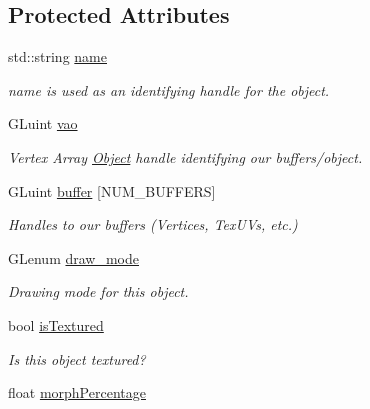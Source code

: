 \subsection*{Protected Attributes}
\begin{DoxyCompactItemize}
\item 
std\-::string \hyperlink{class_object_a24457e0a387492c80594aec7681a2277}{name}
\begin{DoxyCompactList}\small\item\em name is used as an identifying handle for the object. \end{DoxyCompactList}\item 
G\-Luint \hyperlink{class_object_a66190fee29d03d6478516686cbd01eb8}{vao}
\begin{DoxyCompactList}\small\item\em Vertex Array \hyperlink{class_object}{Object} handle identifying our buffers/object. \end{DoxyCompactList}\item 
\hypertarget{class_object_a29de966ce95d96e19262c4f10f0b4276}{G\-Luint \hyperlink{class_object_a29de966ce95d96e19262c4f10f0b4276}{buffer} \mbox{[}N\-U\-M\-\_\-\-B\-U\-F\-F\-E\-R\-S\mbox{]}}\label{class_object_a29de966ce95d96e19262c4f10f0b4276}

\begin{DoxyCompactList}\small\item\em Handles to our buffers (Vertices, Tex\-U\-Vs, etc.) \end{DoxyCompactList}\item 
G\-Lenum \hyperlink{class_object_a82764b385767d989f27d301ab206acb8}{draw\-\_\-mode}
\begin{DoxyCompactList}\small\item\em Drawing mode for this object. \end{DoxyCompactList}\item 
\hypertarget{class_object_a2bbbe3a5b33cbcfc4c536b49d470a6b8}{bool \hyperlink{class_object_a2bbbe3a5b33cbcfc4c536b49d470a6b8}{is\-Textured}}\label{class_object_a2bbbe3a5b33cbcfc4c536b49d470a6b8}

\begin{DoxyCompactList}\small\item\em Is this object textured? \end{DoxyCompactList}\item 
\hypertarget{class_object_ac5ca00d03136434b93ae7d00808554c7}{float \hyperlink{class_object_ac5ca00d03136434b93ae7d00808554c7}{morph\-Percentage}}\label{class_object_ac5ca00d03136434b93ae7d00808554c7}


\end{DoxyCompactItemize}
